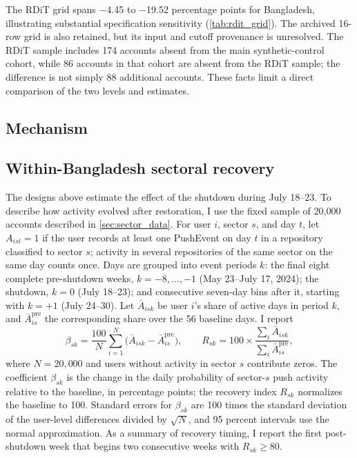 

The RDiT grid spans $-$4.45 to $-$19.52 percentage points for Bangladesh, illustrating substantial specification sensitivity (\cref{tab:rdit_grid}). The archived 16-row grid is also retained, but its input and cutoff provenance is unresolved. The RDiT sample includes 174 accounts absent from the main synthetic-control cohort, while 86 accounts in that cohort are absent from the RDiT sample; the difference is not simply 88 additional accounts. These facts limit a direct comparison of the two levels and estimates.





\subsection{Mechanism}









\subsection{Within-Bangladesh sectoral recovery}
\label{sec:sector_method}

The designs above estimate the effect of the shutdown during July 18--23. To describe how activity evolved after restoration, I use the fixed sample of 20,000 accounts described in \cref{sec:sector_data}. For user $i$, sector $s$, and day $t$, let $A_{ist}=1$ if the user records at least one PushEvent on day $t$ in a repository classified to sector $s$; activity in several repositories of the same sector on the same day counts once. Days are grouped into event periods $k$: the final eight complete pre-shutdown weeks, $k=-8,\dots,-1$ (May 23--July 17, 2024); the shutdown, $k=0$ (July 18--23); and consecutive seven-day bins after it, starting with $k=+1$ (July 24--30). Let $\bar{A}_{isk}$ be user $i$'s share of active days in period $k$, and $\bar{A}^{\mathrm{pre}}_{is}$ the corresponding share over the 56 baseline days. I report
\begin{equation}
  \beta_{sk} = \frac{100}{N}\sum_{i=1}^{N}\bigl(\bar{A}_{isk} - \bar{A}^{\mathrm{pre}}_{is}\bigr),
  \qquad
  R_{sk} = 100 \times \frac{\sum_{i} \bar{A}_{isk}}{\sum_{i} \bar{A}^{\mathrm{pre}}_{is}},
  \label{eq:sector}
\end{equation}
where $N=20{,}000$ and users without activity in sector $s$ contribute zeros. The coefficient $\beta_{sk}$ is the change in the daily probability of sector-$s$ push activity relative to the baseline, in percentage points; the recovery index $R_{sk}$ normalizes the baseline to 100. Standard errors for $\beta_{sk}$ are 100 times the standard deviation of the user-level differences divided by $\sqrt{N}$, and 95 percent intervals use the normal approximation. As a summary of recovery timing, I report the first post-shutdown week that begins two consecutive weeks with $R_{sk}\geq 80$.

